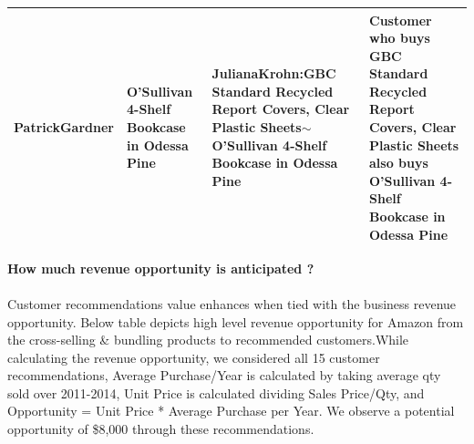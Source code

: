 \documentclass[11pt]{article} %
\begin{document}
\begin{table}[H]
\begin{tabular}{@{}lp{3.5cm}p{3.5cm}p{3.5cm}@{}}
PatrickGardner                                                                       & O'Sullivan 4-Shelf Bookcase in Odessa Pine                                                 & JulianaKrohn:GBC Standard   Recycled Report Covers, Clear Plastic Sheets$\sim$O'Sullivan 4-Shelf Bookcase in   Odessa Pine & Customer who buys GBC Standard   Recycled Report Covers, Clear Plastic Sheets also buys O'Sullivan 4-Shelf   Bookcase in Odessa Pine \\ \bottomrule
\end{tabular}
\end{table}
\clearpage
\textbf{How much revenue opportunity is anticipated ?}\\\\
Customer recommendations value enhances when tied with the business revenue opportunity. Below table depicts high level revenue opportunity for Amazon from the cross-selling \& bundling products to recommended customers.While calculating the revenue opportunity, we considered all 15 customer recommendations, Average Purchase/Year is calculated by taking average qty sold over 2011-2014, Unit Price is calculated dividing Sales Price/Qty, and Opportunity = Unit Price * Average Purchase per Year. We observe a potential opportunity of \$8,000 through these recommendations.
\end{document}

